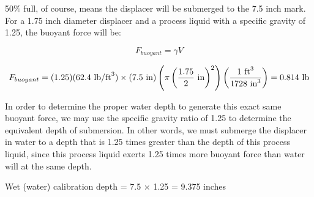 
50\% full, of course, means the displacer will be submerged to the 7.5 inch mark.  For a 1.75 inch diameter displacer and a process liquid with a specific gravity of 1.25, the buoyant force will be:

$$F_{buoyant} = \gamma V$$

$$F_{buoyant} = (1.25)(62.4 \hbox{ lb/ft}^3) \times (7.5 \hbox{ in}) \left(\pi \left({1.75 \over 2} \hbox{ in} \right)^2\right) \left( {1 \hbox{ ft}^3 \over 1728 \hbox{ in}^3} \right) = 0.814 \hbox{ lb}$$

\vskip 10pt

In order to determine the proper water depth to generate this exact same buoyant force, we may use the specific gravity ratio of 1.25 to determine the equivalent depth of submersion.  In other words, we must submerge the displacer in water to a depth that is 1.25 times greater than the depth of this process liquid, since this process liquid exerts 1.25 times more buoyant force than water will at the same depth.

\vskip 10pt

Wet (water) calibration depth = 7.5 $\times$ 1.25 = 9.375 inches




